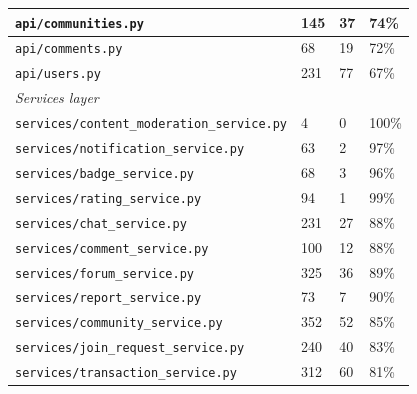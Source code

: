\documentclass[11pt,a4paper]{report}
\begin{document}
\begin{table}[h]
\begin{tabularx}{\textwidth}{|l|X|X|X|}
        \hline
        \texttt{api/communities.py}                       & 145                 & 37              & 74\%              \\
        \hline
        \texttt{api/comments.py}                          & 68                  & 19              & 72\%              \\
        \hline
        \texttt{api/users.py}                             & 231                 & 77              & 67\%              \\
        \hline
        \multicolumn{4}{|l|}{\textit{Services layer}}                                                                 \\
        \hline
        \texttt{services/content\_moderation\_service.py} & 4                   & 0               & 100\%             \\
        \hline
        \texttt{services/notification\_service.py}        & 63                  & 2               & 97\%              \\
        \hline
        \texttt{services/badge\_service.py}               & 68                  & 3               & 96\%              \\
        \hline
        \texttt{services/rating\_service.py}              & 94                  & 1               & 99\%              \\
        \hline
        \texttt{services/chat\_service.py}                & 231                 & 27              & 88\%              \\
        \hline
        \texttt{services/comment\_service.py}             & 100                 & 12              & 88\%              \\
        \hline
        \texttt{services/forum\_service.py}               & 325                 & 36              & 89\%              \\
        \hline
        \texttt{services/report\_service.py}              & 73                  & 7               & 90\%              \\
        \hline
        \texttt{services/community\_service.py}           & 352                 & 52              & 85\%              \\
        \hline
        \texttt{services/join\_request\_service.py}       & 240                 & 40              & 83\%              \\
        \hline
        \texttt{services/transaction\_service.py}         & 312                 & 60              & 81\%              \\

\end{tabularx}
\end{table}
\end{document}

